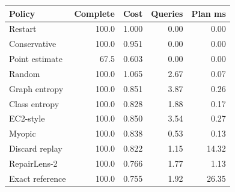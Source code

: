 \begin{tabular}{lrrrr}
\toprule
Policy & Complete & Cost & Queries & Plan ms \\
\midrule
Restart & 100.0 & 1.000 & 0.00 & 0.00 \\
Conservative & 100.0 & 0.951 & 0.00 & 0.00 \\
Point estimate & 67.5 & 0.603 & 0.00 & 0.00 \\
Random & 100.0 & 1.065 & 2.67 & 0.07 \\
Graph entropy & 100.0 & 0.851 & 3.87 & 0.26 \\
Class entropy & 100.0 & 0.828 & 1.88 & 0.17 \\
EC2-style & 100.0 & 0.850 & 3.54 & 0.27 \\
Myopic & 100.0 & 0.838 & 0.53 & 0.13 \\
Discard replay & 100.0 & 0.822 & 1.15 & 14.32 \\
RepairLens-2 & 100.0 & 0.766 & 1.77 & 1.13 \\
Exact reference & 100.0 & 0.755 & 1.92 & 26.35 \\
\bottomrule
\end{tabular}